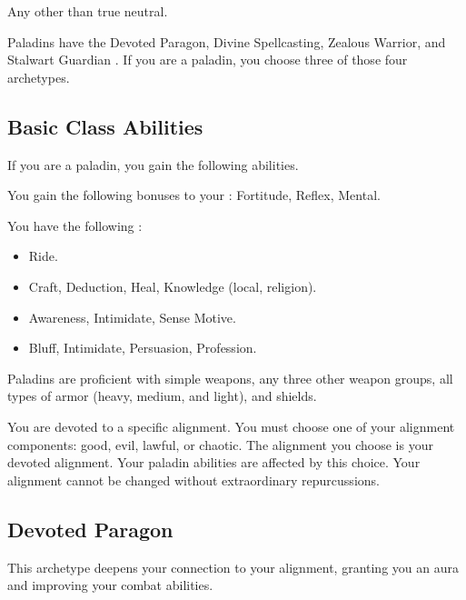      Any other than true neutral.

     Paladins have the Devoted Paragon, Divine Spellcasting, Zealous Warrior, and Stalwart Guardian .
    If you are a paladin, you choose three of those four archetypes.

    \subsection{Basic Class Abilities}
        If you are a paladin, you gain the following abilities.

        You gain the following bonuses to your :  Fortitude,  Reflex,  Mental.

        You have the following :
        \begin{itemize}
            \item {} Ride.
            \item {} Craft, Deduction, Heal, Knowledge (local, religion).
            \item {} Awareness, Intimidate, Sense Motive.
            \item {} Bluff, Intimidate, Persuasion, Profession.
        \end{itemize}

        Paladins are proficient with simple weapons, any three other weapon groups, all types of armor (heavy, medium, and light), and shields.

        You are devoted to a specific alignment.
        You must choose one of your alignment components: good, evil, lawful, or chaotic.
        The alignment you choose is your devoted alignment.
        Your paladin abilities are affected by this choice.
        Your alignment cannot be changed without extraordinary repurcussions.

    \subsection{Devoted Paragon}
        This archetype deepens your connection to your alignment, granting you an aura and improving your combat abilities.

